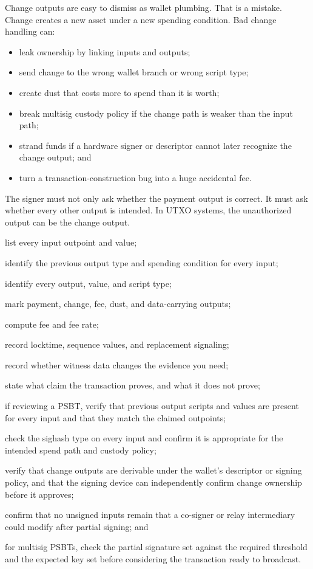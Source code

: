 Change outputs are easy to dismiss as wallet plumbing. That is a mistake. Change creates a new asset under a new spending condition. Bad change handling can:

\begin{itemize}
\item leak ownership by linking inputs and outputs;
\item send change to the wrong wallet branch or wrong script type;
\item create dust that costs more to spend than it is worth;
\item break multisig custody policy if the change path is weaker than the input path;
\item strand funds if a hardware signer or descriptor cannot later recognize the change output; and
\item turn a transaction-construction bug into a huge accidental fee.
\end{itemize}

The signer must not only ask whether the payment output is correct. It must ask whether every other output is intended. In UTXO systems, the unauthorized output can be the change output.

\begin{artifactbox}
\begin{artifactchecklist}
\item list every input outpoint and value;
\item identify the previous output type and spending condition for every input;
\item identify every output, value, and script type;
\item mark payment, change, fee, dust, and data-carrying outputs;
\item compute fee and fee rate;
\item record locktime, sequence values, and replacement signaling;
\item record whether witness data changes the evidence you need;
\item state what claim the transaction proves, and what it does not prove;
\item if reviewing a PSBT, verify that previous output scripts and values are present for every input and that they match the claimed outpoints;
\item check the sighash type on every input and confirm it is appropriate for the intended spend path and custody policy;
\item verify that change outputs are derivable under the wallet's descriptor or signing policy, and that the signing device can independently confirm change ownership before it approves;
\item confirm that no unsigned inputs remain that a co-signer or relay intermediary could modify after partial signing; and
\item for multisig PSBTs, check the partial signature set against the required threshold and the expected key set before considering the transaction ready to broadcast.
\end{artifactchecklist}
\end{artifactbox}

